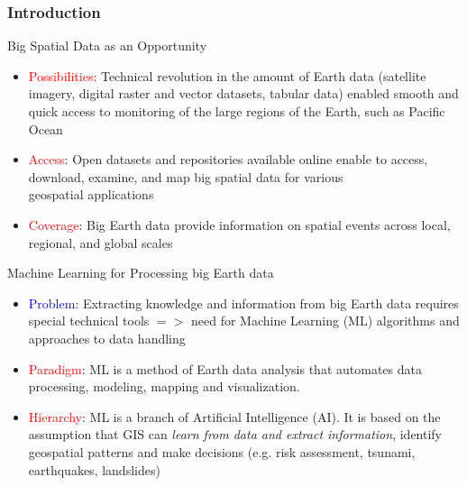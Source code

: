 \documentclass[pdflatex,compress,8pt,
	xcolor={dvipsnames,svgnames,x11names,table},
	hyperref={colorlinks = true,breaklinks = true, urlcolor = NavyBlue}]{beamer}
\begin{document}
\begin{frame}\frametitle{Introduction}

\begin{exampleblock}{Big Spatial Data as an Opportunity}
\begin{itemize}	
	\item \textcolor{red}{Possibilities}: Technical revolution in the amount of Earth data (satellite imagery, digital raster and vector datasets, tabular data) enabled smooth and quick access to monitoring of the large regions of the Earth, such as Pacific Ocean
	\item \textcolor{red}{Access}: Open datasets and repositories available online enable to access, download, examine, and map big spatial data for various \\geospatial applications
	\item \textcolor{red}{Coverage}: Big Earth data provide information on spatial events across local, regional, and global scales 
\end{itemize}
\end{exampleblock}

\begin{exampleblock}{Machine Learning for Processing big Earth data}
\begin{itemize}
	\item \textcolor{blue}{Problem}: Extracting knowledge and information from big Earth data requires special technical tools $=>$ need for Machine Learning (ML) algorithms and approaches to data handling
	\item \textcolor{red}{Paradigm}: ML is a method of Earth data analysis that automates data processing, modeling, mapping and visualization.
	\item \textcolor{red}{Hierarchy}: ML is a branch of Artificial Intelligence (AI). It is based on the assumption that GIS can \emph{learn from data and extract information}, identify geospatial patterns and make decisions (e.g. risk assessment, tsunami, earthquakes, landslides)
\end{itemize}
\end{exampleblock}
	
\end{frame}
\end{document}
